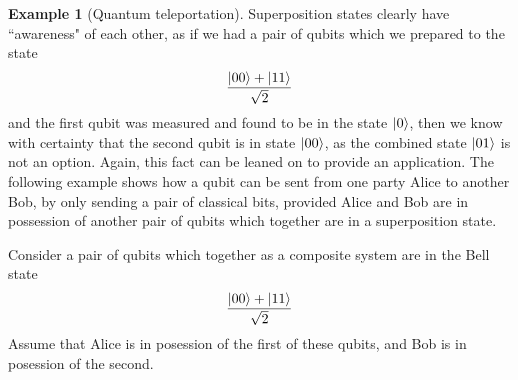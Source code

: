 \documentclass[12pt]{article}
\theoremstyle{plain}
\theoremstyle{definition}
\newtheorem{example}[thm]{Example}
\begin{document}
	\begin{example}[Quantum teleportation]\label{ex:quantum_teleportation}
		Superposition states clearly have ``awareness" of each other, as if we had a pair of qubits which we prepared to the state
		\begin{equation}
			\frac{\ket{00} + \ket{11}}{\sqrt{2}}
		\end{equation}
		and the first qubit was measured and found to be in the state $\ket{0}$, then we know with certainty that the second qubit is in state $\ket{00}$, as the combined state $\ket{01}$ is not an option. Again, this fact can be leaned on to provide an application. The following example shows how a qubit can be sent from one party Alice to another Bob, by only sending a pair of classical bits, provided Alice and Bob are in possession of another pair of qubits which together are in a superposition state.
		
		Consider a pair of qubits which together as a composite system are in the Bell state
		\begin{equation}
			\frac{\ket{00} + \ket{11}}{\sqrt{2}}
		\end{equation}
		Assume that Alice is in posession of the first of these qubits, and Bob is in posession of the second.
		

\end{example}
\end{document}
